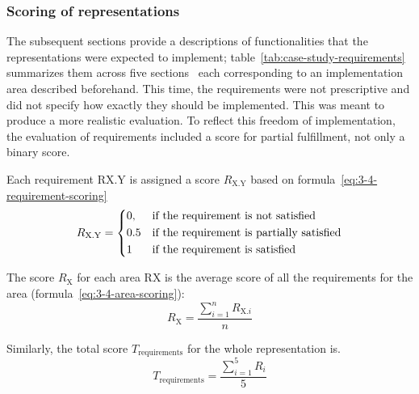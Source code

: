 \subsubsection{Scoring of representations}

The subsequent sections provide a descriptions of functionalities that the representations were expected to implement;
table~\ref{tab:case-study-requirements} summarizes them across five sections \textendash\ each corresponding to an implementation area described beforehand.
This time, the requirements were not prescriptive and did not specify how exactly they should be implemented.
This was meant to produce a more realistic evaluation.
To reflect this freedom of implementation, the evaluation of requirements included a score for partial fulfillment, not only a binary score.

Each requirement RX.Y is assigned a score $R_{\text{X.Y}}$ based on formula~\ref{eq:3-4-requirement-scoring}
\begin{equation}
    R_{\text{X.Y}} =
    \begin{dcases}
        0,  & \text{if the requirement is not satisfied}\\
        0.5 & \text{if the requirement is partially satisfied}\\
        1   & \text{if the requirement is satisfied}
    \end{dcases}
    \label{eq:3-4-requirement-scoring}
\end{equation}

The score $R_{\text{X}}$ for each area RX is the average score of all the requirements for the area (formula~\ref{eq:3-4-area-scoring}):
\begin{equation}
    R_{\text{X}} = \frac{\sum_{i=1}^{n} R_{\text{X.$i$}}}{n}
    \label{eq:3-4-area-scoring}
\end{equation}

Similarly, the total score $T_{\text{requirements}}$ for the whole representation is\textellipsis.
\begin{equation}
    T_{\text{requirements}} = \frac{\sum_{i=1}^{5} R_i}{5}
    \label{eq:3-4-representation-scoring}
\end{equation}

